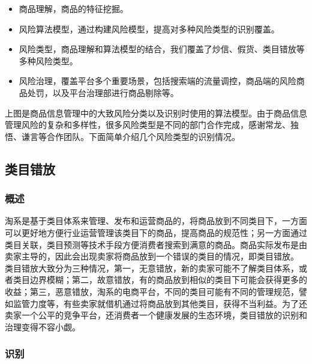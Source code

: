 \begin{itemize}\setlength{\itemsep}{-6pt}
	\item
	商品理解，商品的特征挖掘。
	\item
	风险算法模型，通过构建风险模型，提高对多种风险类型的识别覆盖。
	\item
	风险类型，商品理解和算法模型的结合，我们覆盖了炒信、假货、类目错放等多种风险类型。
	\item
	风险治理，覆盖平台多个重要场景，包括搜索端的流量调控，商品端的风险商品处罚，以及平台治理部进行商品剔除等。
\end{itemize}

上图是商品信息管理中的大致风险分类以及识别时使用的算法模型。由于商品信息管理风险的复杂和多样性，很多风险类型是不同的部门合作完成，感谢常龙、独悟、谦言等合作团队。下面简单介绍几个风险类型的识别情况。

\subsection{类目错放}

\subsubsection{概述}

淘系是基于类目体系来管理、发布和运营商品的，将商品放到不同类目下，一方面可以更好地方便行业运营管理该类目下的商品，提高商品的规范性；另一方面通过类目关联，类目预测等技术手段方便消费者搜索到满意的商品。商品实际发布是由卖家主导的，因此会出现卖家将商品放到一个错误的类目的情况，即类目错放。
类目错放大致分为三种情况，第一，无意错放，新的卖家可能不了解类目体系，或者类目边界模糊；第二，故意错放，有的商品放到相似的类目下可能会获得更多的收益；第三，恶意错放，淘系的电商平台，不同的类目可能有不同的管理规范，譬如监管力度等，有些卖家就借机通过将商品放到其他类目，获得不当利益。为了还卖家一个公平的竞争平台，还消费者一个健康发展的生态环境，类目错放的识别和治理变得不容小觑。

\subsubsection{识别}

